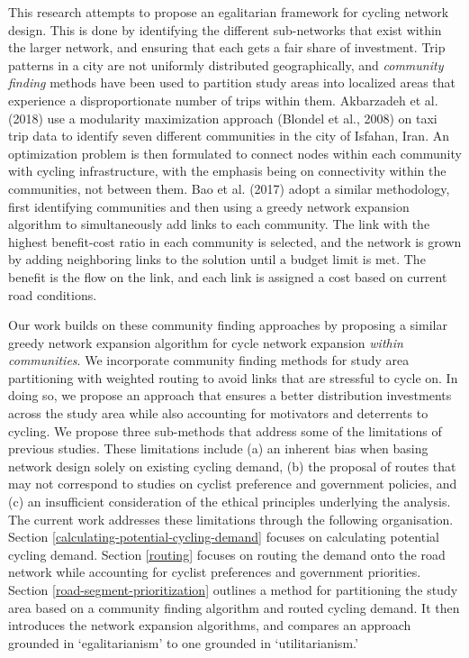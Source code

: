 \documentclass[
]{article}
\begin{document}
This research attempts to propose an egalitarian framework for cycling
network design. This is done by identifying the different sub-networks
that exist within the larger network, and ensuring that each gets a fair
share of investment. Trip patterns in a city are not uniformly
distributed geographically, and \emph{community finding} methods have been
used to partition study areas into localized areas that experience a
disproportionate number of trips within them. Akbarzadeh et al. (2018)
use a modularity maximization approach (Blondel et al., 2008) on taxi trip
data to identify seven different communities in the city of Isfahan, Iran.
An optimization problem is then formulated to connect nodes within each
community with cycling infrastructure, with the emphasis being on
connectivity within the communities, not between them. Bao et al. (2017)
adopt a similar methodology, first identifying communities and then
using a greedy network expansion algorithm to simultaneously add links
to each community. The link with the highest benefit-cost ratio in each
community is selected, and the network is grown by adding neighboring
links to the solution until a budget limit is met. The benefit is the
flow on the link, and each link is assigned a cost based on current road
conditions.

Our work builds on these community finding approaches by proposing a
similar greedy network expansion algorithm for cycle network expansion
\emph{within communities}. We incorporate community finding methods for study
area partitioning with weighted routing to avoid links that are
stressful to cycle on. In doing so, we propose an approach that ensures a better distribution
investments across the study area while also accounting for motivators and deterrents to cycling.
We propose three sub-methods that address some of the limitations of previous
studies. These limitations include (a) an inherent bias when basing network
design solely on existing cycling demand, (b) the proposal of routes that may
not correspond to studies on cyclist preference and government policies,
and (c) an insufficient consideration of the ethical principles underlying
the analysis. The current work addresses these limitations through the following organisation. Section \ref{calculating-potential-cycling-demand}
focuses on calculating potential cycling demand. Section \ref{routing}
focuses on routing the demand onto the road network while accounting for
cyclist preferences and government priorities. Section
\ref{road-segment-prioritization} outlines a method for partitioning the
study area based on a community finding algorithm and routed cycling
demand. It then introduces the network expansion algorithms, and compares an approach grounded in
`egalitarianism' to one grounded in `utilitarianism.'
\end{document}
